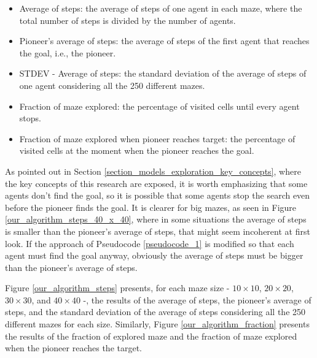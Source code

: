 \begin{itemize}
\item Average of steps: the average of steps of one agent in each maze, where the total number of steps is divided by the number of agents.

\item Pioneer's average of steps: the average of steps of the first agent that reaches the goal, i.e., the pioneer.

\item STDEV - Average of steps: the standard deviation of the average of steps of one agent considering all the 250 different mazes.

\item Fraction of maze explored: the percentage of visited cells until every agent stops.

\item Fraction of maze explored when pioneer reaches target: the percentage of visited cells at the moment when the pioneer reaches the goal.
\end{itemize}

As pointed out in Section \ref{section_models_exploration_key_concepts}, where the key concepts of this research are exposed, it is worth emphasizing that some agents don't find the goal, so it is possible that some agents stop the search even before the pioneer finds the goal. It is clearer for big mazes, as seen in Figure \ref{our_algorithm_steps_40_x_40}, where in some situations the average of steps is smaller than the pioneer's average of steps, that might seem incoherent at first look. If the approach of Pseudocode \ref{pseudocode_1} is modified so that each agent must find the goal anyway, obviously the average of steps must be bigger than the pioneer's average of steps.

Figure \ref{our_algorithm_steps} presents, for each maze size - $10 \times 10$, $20 \times 20$, $30 \times 30$, and $40 \times 40$ -, the results of the average of steps, the pioneer's average of steps, and the standard deviation of the average of steps considering all the 250 different mazes for each size. Similarly, Figure \ref{our_algorithm_fraction} presents the results of the fraction of explored maze and the fraction of maze explored when the pioneer reaches the target.

